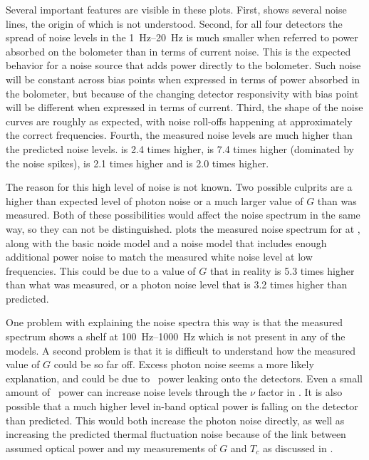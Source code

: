 Several important features are visible in these plots.
First,  shows several noise lines, the origin of which is not understood.
Second, for all four detectors the spread of noise levels in the \SIrange{1}{20}{\hertz} is much smaller when referred to power absorbed on the bolometer than in terms of current noise.
This is the expected behavior for a noise source that adds power directly to the bolometer.
Such noise will be constant across bias points when expressed in terms of power absorbed in the bolometer, but because of the changing detector responsivity with bias point will be different when expressed in terms of current.
Third, the shape of the noise curves are roughly as expected, with noise roll-offs happening at approximately the correct frequencies.
Fourth, the measured noise levels are much higher than the predicted noise levels.
 is 2.4 times higher,  is 7.4 times higher (dominated by the noise spikes),  is 2.1 times higher and  is 2.0 times higher.

The reason for this high level of noise is not known.
Two possible culprits are a higher than expected level of photon noise or a much larger value of $G$ than was measured.
Both of these possibilities would affect the noise spectrum in the same way, so they can not be distinguished.
 plots the measured noise spectrum for  at \SOC, along with the basic noide model and a noise model that includes enough additional power noise to match the measured white noise level at low frequencies.
This could be due to a value of $G$ that in reality is 5.3 times higher than what was measured, or a photon noise level that is 3.2 times higher than predicted.

One problem with explaining the noise spectra this way is that the measured spectrum shows a shelf at \SIrange{100}{1000}{\hertz} which is not present in any of the models.
A second problem is that it is difficult to understand how the measured value of $G$ could be so far off.
Excess photon noise seems a more likely explanation, and could be due to \IR\ power leaking onto the detectors.
Even a small amount of \IR\ power can increase noise levels through the $\nu$ factor in .
It is also possible that a much higher level in-band optical power is falling on the detector than predicted.
This would both increase the photon noise directly, as well as increasing the predicted thermal fluctuation noise because of the link between assumed optical power and my measurements of $G$ and $T_c$ as discussed in .

